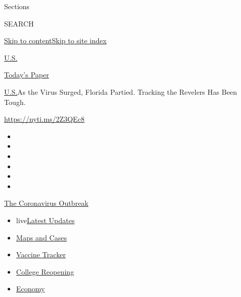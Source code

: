 Sections

SEARCH

\protect\hyperlink{site-content}{Skip to
content}\protect\hyperlink{site-index}{Skip to site index}

\href{https://www.nytimes3xbfgragh.onion/section/us}{U.S.}

\href{https://myaccount.nytimes3xbfgragh.onion/auth/login?response_type=cookie\&client_id=vi}{}

\href{https://www.nytimes3xbfgragh.onion/section/todayspaper}{Today's
Paper}

\href{/section/us}{U.S.}\textbar{}As the Virus Surged, Florida Partied.
Tracking the Revelers Has Been Tough.

\url{https://nyti.ms/2Z3QEc8}

\begin{itemize}
\item
\item
\item
\item
\item
\item
\end{itemize}

\href{https://www.nytimes3xbfgragh.onion/news-event/coronavirus?action=click\&pgtype=Article\&state=default\&region=TOP_BANNER\&context=storylines_menu}{The
Coronavirus Outbreak}

\begin{itemize}
\tightlist
\item
  live\href{https://www.nytimes3xbfgragh.onion/2020/08/04/world/coronavirus-cases.html?action=click\&pgtype=Article\&state=default\&region=TOP_BANNER\&context=storylines_menu}{Latest
  Updates}
\item
  \href{https://www.nytimes3xbfgragh.onion/interactive/2020/us/coronavirus-us-cases.html?action=click\&pgtype=Article\&state=default\&region=TOP_BANNER\&context=storylines_menu}{Maps
  and Cases}
\item
  \href{https://www.nytimes3xbfgragh.onion/interactive/2020/science/coronavirus-vaccine-tracker.html?action=click\&pgtype=Article\&state=default\&region=TOP_BANNER\&context=storylines_menu}{Vaccine
  Tracker}
\item
  \href{https://www.nytimes3xbfgragh.onion/2020/08/02/us/covid-college-reopening.html?action=click\&pgtype=Article\&state=default\&region=TOP_BANNER\&context=storylines_menu}{College
  Reopening}
\item
  \href{https://www.nytimes3xbfgragh.onion/live/2020/08/04/business/stock-market-today-coronavirus?action=click\&pgtype=Article\&state=default\&region=TOP_BANNER\&context=storylines_menu}{Economy}
\end{itemize}

